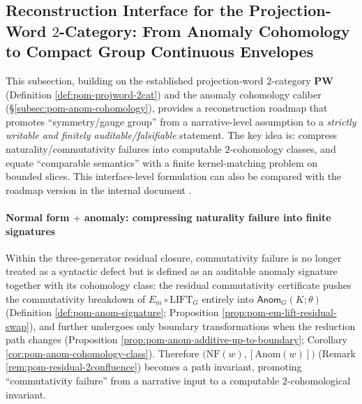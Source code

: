 \subsection{Reconstruction Interface for the Projection-Word \texorpdfstring{$2$}{2}-Category: From Anomaly Cohomology to Compact Group Continuous Envelopes}\label{subsec:pom-pw-tannaka-krein-reconstruction}
This subsection, building on the established projection-word \(2\)-category \(\mathbf{PW}\) (Definition \ref{def:pom-projword-2cat}) and the anomaly cohomology caliber (\S\ref{subsec:pom-anom-cohomology}),
provides a reconstruction roadmap that promotes ``symmetry/gauge group'' from a narrative-level assumption to a \emph{strictly writable and finitely auditable/falsifiable} statement.
The key idea is: compress naturality/commutativity failures into computable \(2\)-cohomology classes, and equate ``comparable semantics'' with a finite kernel-matching problem on bounded slices.
This interface-level formulation can also be compared with the roadmap version in the internal document \cite{Internal2026PW2CategoryTannakaKreinSM}.

\paragraph{Normal form \texorpdfstring{$+$}{+} anomaly: compressing naturality failure into finite signatures}
Within the three-generator residual closure, commutativity failure is no longer treated as a syntactic defect but is defined as an auditable anomaly signature together with its cohomology class:
the residual commutativity certificate pushes the commutativity breakdown of \(E_m\circ \mathrm{LIFT}_G\) entirely into \(\mathsf{Anom}_G(K;\theta)\) (Definition \ref{def:pom-anom-signature}; Proposition \ref{prop:pom-em-lift-residual-swap}),
and further undergoes only boundary transformations when the reduction path changes (Proposition \ref{prop:pom-anom-additive-up-to-boundary}; Corollary \ref{cor:pom-anom-cohomology-class}).
Therefore \(\bigl(\mathrm{NF}(w),[\mathrm{Anom}(w)]\bigr)\) (Remark \ref{rem:pom-residual-2confluence}) becomes a path invariant,
promoting ``commutativity failure'' from a narrative input to a computable \(2\)-cohomological invariant.

